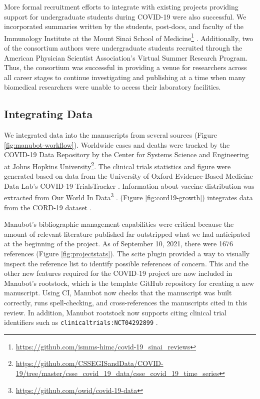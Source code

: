 \documentclass[twocolumn]{ceurart}
\begin{document}
More formal recruitment efforts to integrate with existing projects providing support for undergraduate students during COVID-19 were also successful.
We incorporated summaries written by the students, post-docs, and faculty of the Immunology Institute at the Mount Sinai School of Medicine\footnote{\url{https://github.com/ismms-himc/covid-19_sinai_reviews}} \citep{YZ4cHNuH}.
Additionally, two of the consortium authors were undergraduate students recruited through the American Physician Scientist Association's Virtual Summer Research Program.
Thus, the consortium was successful in providing a venue for researchers across all career stages to continue investigating and publishing at a time when many biomedical researchers were unable to access their laboratory facilities.

\hypertarget{integrating-data}{%
\subsection{Integrating Data}\label{integrating-data}}

We integrated data into the manuscripts from several sources (Figure \ref{fig:manubot-workflow}).
Worldwide cases and deaths were tracked by the COVID-19 Data Repository by the Center for Systems Science and Engineering at Johns Hopkins University\footnote{\url{https://github.com/CSSEGISandData/COVID-19/tree/master/csse_covid_19_data/csse_covid_19_time_series}}.
The clinical trials statistics and figure were generated based on data from the University of Oxford Evidence-Based Medicine Data Lab's COVID-19 TrialsTracker \citep{SSbnPnzT}.
Information about vaccine distribution was extracted from Our World In Data\footnote{\url{https://github.com/owid/covid-19-data}} \citep{ZHvhFakW}.
(Figure \ref{fig:cord19-growth}) integrates data from the CORD-19 dataset \citep{CiOwklc6}.

Manubot's bibliographic management capabilities were critical because the amount of relevant literature published far outstripped what we had anticipated at the beginning of the project.
As of September 10, 2021, there were 1676 references (Figure \ref{fig:projectstats}).
The scite plugin provided a way to visually inspect the reference list to identify possible references of concern.
This and the other new features required for the COVID-19 project are now included in Manubot's rootstock, which is the template GitHub repository for creating a new manuscript.
Using CI, Manubot now checks that the manuscript was built correctly, runs spell-checking, and cross-references the manuscripts cited in this review.
In addition, Manubot rootstock now supports citing clinical trial identifiers such as \texttt{clinicaltrials:NCT04292899} \citep{yTCAmOyt}.
\end{document}
